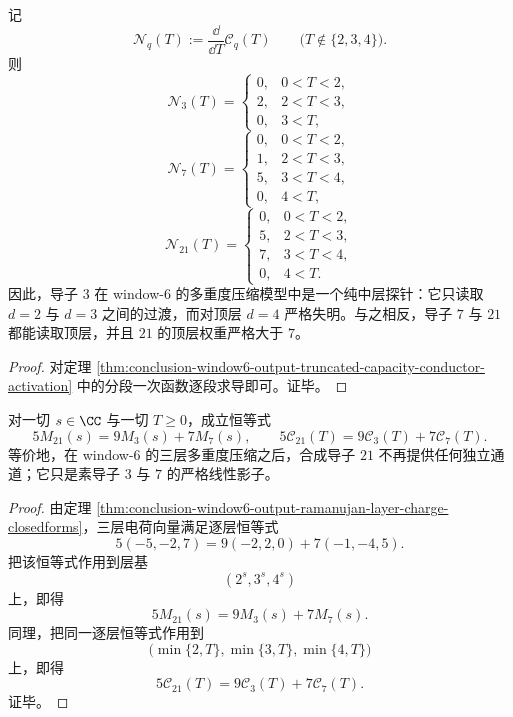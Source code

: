 \begin{corollary}\label{cor:conclusion-window6-output-conductor-three-middle-layer-probe}
记
\[
\mathcal N_q(T):=\frac{\dd}{\dd T}\mathcal C_q(T)
\qquad
\bigl(T\notin\{2,3,4\}\bigr).
\]
则
\[
\mathcal N_3(T)=
\begin{cases}
0,& 0<T<2,\\
2,& 2<T<3,\\
0,& 3<T,
\end{cases}
\]
\[
\mathcal N_7(T)=
\begin{cases}
0,& 0<T<2,\\
1,& 2<T<3,\\
5,& 3<T<4,\\
0,& 4<T,
\end{cases}
\]
\[
\mathcal N_{21}(T)=
\begin{cases}
0,& 0<T<2,\\
5,& 2<T<3,\\
7,& 3<T<4,\\
0,& 4<T.
\end{cases}
\]
因此，导子 \(3\) 在 window-\(6\) 的多重度压缩模型中是一个纯中层探针：它只读取 \(d=2\) 与 \(d=3\) 之间的过渡，而对顶层 \(d=4\) 严格失明。与之相反，导子 \(7\) 与 \(21\) 都能读取顶层，并且 \(21\) 的顶层权重严格大于 \(7\)。
\end{corollary}
\begin{proof}
对定理 \ref{thm:conclusion-window6-output-truncated-capacity-conductor-activation} 中的分段一次函数逐段求导即可。证毕。
\end{proof}

\begin{theorem}\label{thm:conclusion-window6-output-composite-conductor-collapse}
对一切 \(s\in\CC\) 与一切 \(T\ge 0\)，成立恒等式
\[
\boxed{\;
5M_{21}(s)=9M_3(s)+7M_7(s),\qquad
5\mathcal C_{21}(T)=9\mathcal C_3(T)+7\mathcal C_7(T).\;}
\]
等价地，在 window-\(6\) 的三层多重度压缩之后，合成导子 \(21\) 不再提供任何独立通道；它只是素导子 \(3\) 与 \(7\) 的严格线性影子。
\end{theorem}
\begin{proof}
由定理 \ref{thm:conclusion-window6-output-ramanujan-layer-charge-closedforms}，三层电荷向量满足逐层恒等式
\[
5(-5,-2,7)=9(-2,2,0)+7(-1,-4,5).
\]
把该恒等式作用到层基
\[
(2^s,3^s,4^s)
\]
上，即得
\[
5M_{21}(s)=9M_3(s)+7M_7(s).
\]
同理，把同一逐层恒等式作用到
\[
\bigl(\min\{2,T\},\min\{3,T\},\min\{4,T\}\bigr)
\]
上，即得
\[
5\mathcal C_{21}(T)=9\mathcal C_3(T)+7\mathcal C_7(T).
\]
证毕。
\end{proof}


